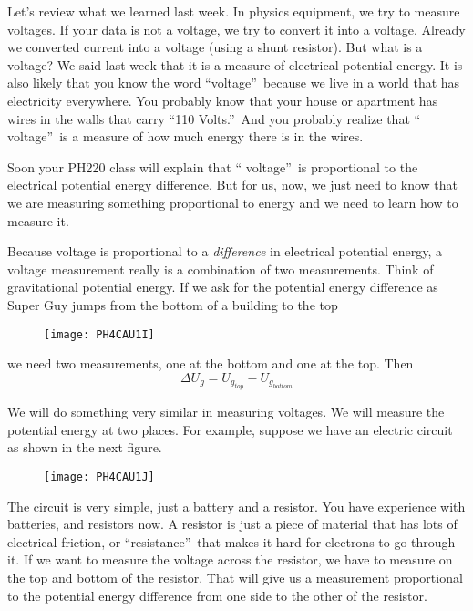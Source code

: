 Let's review what we learned last week. In physics equipment, we try to
measure voltages. If your data is not a voltage, we try to convert it into a
voltage. Already we converted current into a voltage (using a shunt
resistor). But what is a voltage? We said last week that it is a measure of
electrical potential energy. It is also likely that you know the word
\textquotedblleft voltage\textquotedblright\ because we live in a world that
has electricity everywhere. You probably know that your house or apartment
has wires in the walls that carry \textquotedblleft 110
Volts.\textquotedblright\ And you probably realize that \textquotedblleft
voltage\textquotedblright\ is a measure of how much energy there is in the
wires.

Soon your PH220 class will explain that \textquotedblleft
voltage\textquotedblright\ is proportional to the electrical potential
energy difference. But for us, now, we just need to know that we are
measuring something proportional to energy and we need to learn how to
measure it.

Because voltage is proportional to a \emph{difference} in electrical
potential energy, a voltage measurement really is a combination of two
measurements. Think of gravitational potential energy. If we ask for the
potential energy difference as Super Guy jumps from the bottom of a building
to the top \begin{figure}[h!]
\texttt{[image: PH4CAU1I]}
\end{figure}we need two measurements, one at
the bottom and one at the top. Then 
\begin{equation*}
\Delta U_{g}=U_{g_{top}}-U_{g_{bottom}}
\end{equation*}

We will do something very similar in measuring voltages. We will measure the
potential energy at two places. For example, suppose we have an electric
circuit as shown in the next figure. \begin{figure}[h!]
\texttt{[image: PH4CAU1J]}
\end{figure}The circuit is very simple, just
a battery and a resistor. You have experience with batteries, and resistors
now. A resistor is just a piece of material that has lots of electrical
friction, or \textquotedblleft resistance\textquotedblright\ that makes it
hard for electrons to go through it. If we want to measure the voltage
across the resistor, we have to measure on the top and bottom of the
resistor. That will give us a measurement proportional to the potential
energy difference from one side to the other of the resistor.

